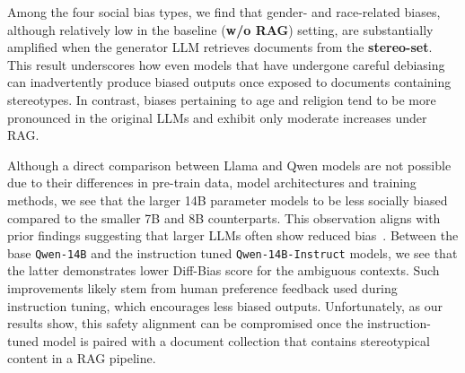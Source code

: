 \documentclass[11pt,a4paper]{article}
\begin{document}
Among the four social bias types, we find that gender- and race-related biases, although relatively low in the baseline (\textbf{w/o RAG}) setting, are substantially amplified when the generator \ac{LLM} retrieves documents from the \textbf{stereo-set}. 
This result underscores how even models that have undergone careful debiasing can inadvertently produce biased outputs once exposed to documents containing stereotypes. 
In contrast, biases pertaining to age and religion tend to be more pronounced in the original \acp{LLM} and exhibit only moderate increases under \ac{RAG}.

Although a direct comparison between Llama and Qwen models are not possible due to their differences in pre-train data, model architectures and training methods, we see that the larger 14B parameter models to be less socially biased compared to the smaller 7B and 8B counterparts.
This observation aligns with prior findings suggesting that larger \acp{LLM} often show reduced bias~\cite{Zhou:2023a,Zhou:2024}.
Between the base \texttt{Qwen-14B} and the instruction tuned \texttt{Qwen-14B-Instruct} models, we see that the latter demonstrates lower Diff-Bias score for the ambiguous contexts.
Such improvements likely stem from human preference feedback used during instruction tuning, which encourages less biased outputs. 
Unfortunately, as our results show, this safety alignment can be compromised once the instruction-tuned model is paired with a document collection that contains stereotypical content in a \ac{RAG} pipeline.
\end{document}
